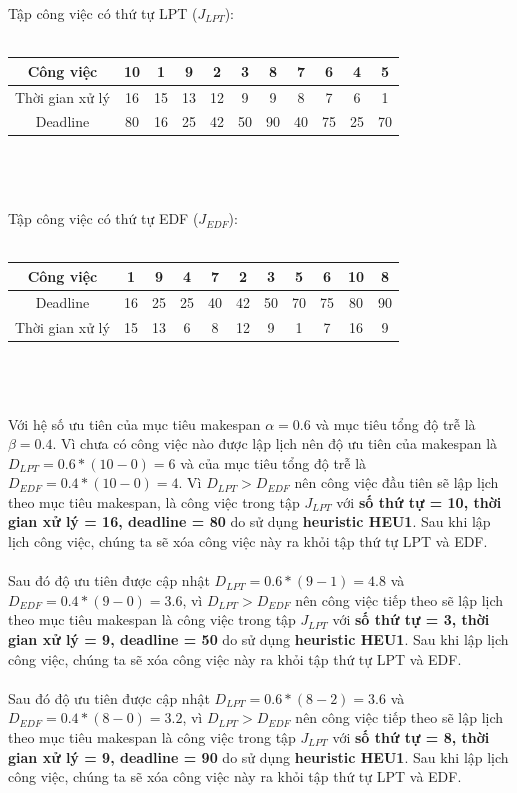 \documentclass[a4paper,12pt]{article}
\begin{document}
Tập công việc có thứ tự LPT ($J_{LPT}$):\\\\
\begin{tabular}{|c|c|c|c|c|c|c|c|c|c|c|}
\hline
Công việc&10&1&9&2&3&8&7&6&4&5\\
\hline
Thời gian xử lý&16&15&13&12&9&9&8&7&6&1\\
\hline
Deadline&80&16&25&42&50&90&40&75&25&70\\
\hline
\end{tabular}
\\\\\\
Tập công việc có thứ tự EDF ($J_{EDF}$):\\\\
\begin{tabular}{|c|c|c|c|c|c|c|c|c|c|c|}
\hline
Công việc&1&9&4&7&2&3&5&6&10&8\\
\hline
Deadline&16&25&25&40&42&50&70&75&80&90\\
\hline
Thời gian xử lý&15&13&6&8&12&9&1&7&16&9\\
\hline
\end{tabular}
\\\\\\
Với hệ số ưu tiên của mục tiêu makespan $\alpha = 0.6$ và mục tiêu tổng độ trễ là $\beta = 0.4$. Vì chưa có công việc nào được lập lịch nên độ ưu tiên của makespan là $D_{LPT} = 0.6*(10 - 0) = 6$ và của mục tiêu tổng độ trễ là $D_{EDF} = 0.4*(10 - 0) = 4$. Vì $D_{LPT} > D_{EDF}$ nên công việc đầu tiên sẽ lập lịch theo mục tiêu makespan, là công việc trong tập $J_{LPT}$ với \textbf{số thứ tự = 10, thời gian xử lý = 16, deadline = 80} do sử dụng \textbf{heuristic HEU1}. Sau khi lập lịch công việc, chúng ta sẽ xóa công việc này ra khỏi tập thứ tự LPT và EDF.\\\\
Sau đó độ ưu tiên được cập nhật $D_{LPT} = 0.6*(9 - 1) = 4.8$ và $D_{EDF} = 0.4*(9 - 0) = 3.6$, vì $D_{LPT} > D_{EDF}$ nên công việc tiếp theo sẽ lập lịch theo mục tiêu makespan là công việc trong tập $J_{LPT}$ với \textbf{số thứ tự = 3, thời gian xử lý = 9, deadline = 50} do sử dụng \textbf{heuristic HEU1}. Sau khi lập lịch công việc, chúng ta sẽ xóa công việc này ra khỏi tập thứ tự LPT và EDF.\\\\
Sau đó độ ưu tiên được cập nhật $D_{LPT} = 0.6*(8 - 2) = 3.6$ và $D_{EDF} = 0.4*(8 - 0) = 3.2$, vì $D_{LPT} > D_{EDF}$ nên công việc tiếp theo sẽ lập lịch theo mục tiêu makespan là công việc trong tập $J_{LPT}$ với \textbf{số thứ tự = 8, thời gian xử lý = 9, deadline = 90} do sử dụng \textbf{heuristic HEU1}. Sau khi lập lịch công việc, chúng ta sẽ xóa công việc này ra khỏi tập thứ tự LPT và EDF.\\\\
\end{document}
